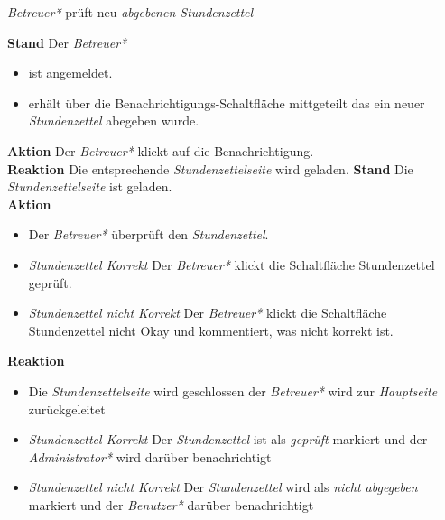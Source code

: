 \begin{requirements}
	 \emph{Betreuer*} prüft neu \emph{abgebenen Stundenzettel}
	\begin{requirements}
	        \textbf{Stand} Der \emph{Betreuer*}
	            \begin{itemize}
	                \item ist angemeldet.
	                \item erhält über die Benachrichtigungs-Schaltfläche mittgeteilt das ein neuer \emph{Stundenzettel} abegeben wurde.
	            \end{itemize}
            \textbf{Aktion} Der \emph{Betreuer*} klickt auf die Benachrichtigung. \\
            \textbf{Reaktion} Die entsprechende \emph{Stundenzettelseite} wird  geladen.
	        \textbf{Stand} Die \emph{Stundenzettelseite} ist geladen. \\
            \textbf{Aktion}
                \begin{itemize}
                    \item Der \emph{Betreuer*} überprüft den \emph{Stundenzettel}.
                    \item \textit{Stundenzettel Korrekt} Der \emph{Betreuer*} klickt die Schaltfläche Stundenzettel geprüft.
                    \item \textit{Stundenzettel nicht Korrekt}  Der \emph{Betreuer*} klickt die Schaltfläche Stundenzettel nicht Okay und kommentiert, was nicht korrekt ist.
                \end{itemize}
            \textbf{Reaktion}
                \begin{itemize}
                    \item Die \emph{Stundenzettelseite} wird geschlossen der \emph{Betreuer*} wird zur \emph{Hauptseite} zurückgeleitet
                    \item \textit{Stundenzettel Korrekt} Der \emph{Stundenzettel} ist als \emph{geprüft} markiert und der \emph{Administrator*} wird darüber benachrichtigt
                    \item \textit{Stundenzettel nicht Korrekt} Der \emph{Stundenzettel} wird als \emph{nicht abgegeben} markiert und der \emph{Benutzer*} darüber benachrichtigt
                \end{itemize}
	\end{requirements}


\end{requirements}
